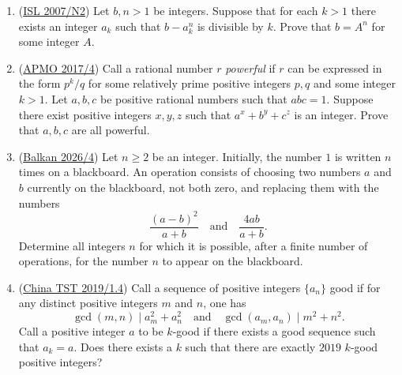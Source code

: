 \documentclass[11pt,paper=letter]{scrartcl}
\begin{document}
\begin{enumerate}[resume]

\item (\href{https://artofproblemsolving.com/community/c6h214712p1187198}{ISL 2007/N2}) Let $b,n > 1$ be integers. Suppose that for each $k > 1$ there exists an integer $a_k$ such that $b - a^n_k$ is divisible by $k$. Prove that $b = A^n$ for some integer $A$. \hint{\ref{h:12-1}}

\item (\href{https://artofproblemsolving.com/community/c6h1446913p8271420}{APMO 2017/4}) Call a rational number $r$ \textit{powerful} if $r$ can be expressed in the form $p^k/q$ for some relatively prime positive integers $p, q$ and some integer $k >1$. Let $a, b, c$ be positive rational numbers such that $abc = 1$. Suppose there exist positive integers $x, y, z$ such that $a^x + b^y + c^z$ is an integer. Prove that $a, b, c$ are all powerful. \hints{\ref{h:13-1} \ref{h:13-2} \ref{h:13-3}}

\item (\href{https://artofproblemsolving.com/community/c6h3827467p38044666}{Balkan 2026/4}) Let $n \ge 2$ be an integer. Initially, the number $1$ is written $n$ times on a blackboard. An operation consists of choosing two numbers $a$ and $b$ currently on the blackboard, not both zero, and replacing them with the numbers \[ \frac{(a - b)^2}{a + b} \quad \text{and} \quad \frac{4ab}{a + b}. \]Determine all integers $n$ for which it is possible, after a finite number of operations, for the number $n$ to appear on the blackboard. \hints{\ref{h:14-1} \ref{h:14-2} \ref{h:14-3}}

\item (\href{https://artofproblemsolving.com/community/c6h1799942p11944591}{China TST 2019/1.4}) Call a sequence of positive integers $\{a_n\}$ good if for any distinct positive integers $m$ and $n$, one has $$\gcd(m,n) \mid a_m^2 + a_n^2 \quad \text{and} \quad \gcd(a_m,a_n) \mid m^2 + n^2.$$Call a positive integer $a$ to be $k$-good if there exists a good sequence such that $a_k = a$. Does there exists a $k$ such that there are exactly $2019$ $k$-good positive integers? \hints{\ref{h:15-1} \ref{h:15-2} \ref{h:15-3}}


\end{enumerate}
\end{document}
